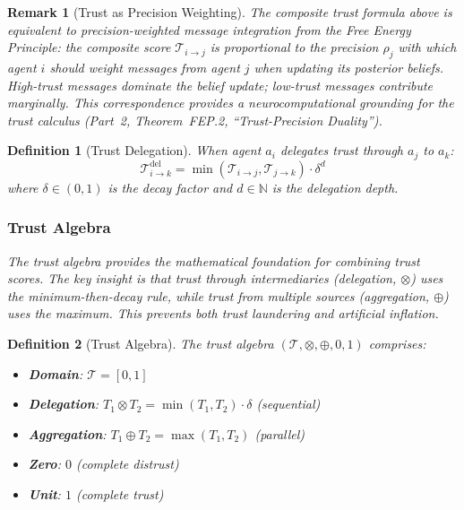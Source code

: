 \documentclass[
]{article}
\newtheorem{definition}{Definition}[section]
\newtheorem{remark}[theorem]{Remark}
\begin{document}
\begin{remark}[Trust as Precision Weighting]
\label{rem:trust-precision}
The composite trust formula above is equivalent to precision-weighted
message integration from the Free Energy Principle: the composite score
$\mathcal{T}_{i\to j}$ is proportional to the precision $\rho_j$ with
which agent $i$ should weight messages from agent $j$ when updating its
posterior beliefs.  High-trust messages dominate the belief update;
low-trust messages contribute marginally.  This correspondence provides a
neurocomputational grounding for the trust calculus (Part~2, Theorem~FEP.2, ``Trust-Precision Duality'').
\end{remark}

\begin{definition}[Trust Delegation]
\label{def:trust-delegation}
When agent $a_i$ delegates trust through $a_j$ to $a_k$:
\begin{equation}
\label{eq:trust-delegation}
\mathcal{T}_{i \to k}^{\text{del}} = \min(\mathcal{T}_{i \to j}, \mathcal{T}_{j \to k}) \cdot \delta^d
\end{equation}
where $\delta \in (0, 1)$ is the decay factor and $d \in \mathbb{N}$ is the delegation depth.
\end{definition}

\subsubsection{Trust Algebra}\label{trust-algebra}

\emph{The trust algebra provides the mathematical foundation for
combining trust scores. The key insight is that trust through
intermediaries (delegation, \(\otimes\)) uses the minimum-then-decay
rule, while trust from multiple sources (aggregation, \(\oplus\)) uses
the maximum. This prevents both trust laundering and artificial
inflation.}

\begin{definition}[Trust Algebra]
\label{def:trust-algebra}
The trust algebra $(\mathcal{T}, \otimes, \oplus, 0, 1)$ comprises:
\begin{itemize}
\item \textbf{Domain}: $\mathcal{T} = [0, 1]$
\item \textbf{Delegation}: $T_1 \otimes T_2 = \min(T_1, T_2) \cdot \delta$ (sequential)
\item \textbf{Aggregation}: $T_1 \oplus T_2 = \max(T_1, T_2)$ (parallel)
\item \textbf{Zero}: $0$ (complete distrust)
\item \textbf{Unit}: $1$ (complete trust)
\end{itemize}
\end{definition}
\end{document}
